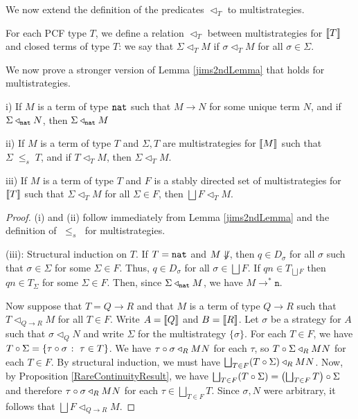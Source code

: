 \documentclass{entcs} \usepackage{prentcsmacro}
\newcommand{\stle}{{\;\le_s\;}}
\newcommand{\exlub}{\bigsqcup}
\newcommand{\opto}{\longrightarrow}
\newcommand{\n}{{\mathtt{n}}}
\newcommand{\0}{{\mathtt{0}}}
\newcommand{\plot}{\triangleleft}
\newcommand{\Tau}{T}
\begin{document}
We now extend the definition of the predicates $\plot_T$ to multistrategies.  

\begin{definition}
  For each PCF type $T$, we define a relation $\plot_T$ between multistrategies for $\left\llbracket T\right\rrbracket$ and closed terms of type $T$: we say that $\Sigma\plot_TM$ if $\sigma\plot_TM$ for all $\sigma\in\Sigma$.  
\end{definition}

We now prove a stronger version of Lemma \ref{jims2ndLemma} that holds for multistrategies.  

\begin{lemma}
  \label{multijims2ndLemma}
  i) If $M$ is a term of type ${\mathtt{nat}}$ such that $M\opto N$ for some unique term $N$, and if $\Sigma\plot_\nat N$, then $\Sigma\plot_\nat M$

  ii) If $M$ is a term of type $T$ and $\Sigma,\Tau$ are multistrategies for $\left\llbracket M\right\rrbracket$ such that $\Sigma\stle\Tau$, and if $\Tau\plot_TM$, then $\Sigma\plot_TM$.

  iii) If $M$ is a term of type $T$ and $F$ is a stably directed set of multistrategies for $\left\llbracket T\right\rrbracket$ such that $\Sigma\plot_TM$ for all $\Sigma\in F$, then $\exlub F\plot_TM$.
\end{lemma}
\begin{proof}
  (i) and (ii) follow immediately from Lemma \ref{jims2ndLemma} and the definition of $\stle$ for multistrategies.

  (iii): Structural induction on $T$.  If $T={\mathtt{nat}}$ and $M\not\Downarrow$, then $q\in D_\sigma$ for all $\sigma$ such that $\sigma\in\Sigma$ for some $\Sigma\in F$.  Thus, $q\in D_\sigma$ for all $\sigma\in\exlub F$.  If $qn\in T_{\exlub F}$ then $qn\in T_\Sigma$ for some $\Sigma\in F$.  Then, since $\Sigma\plot_\nat M$, we have $M\opto^*\n$.  

  Now suppose that $T=Q\to R$ and that $M$ is a term of type $Q\to R$ such that $\Tau\plot_{Q\to R}M$ for all $\Tau\in F$.  Write $A=\left\llbracket Q\right\rrbracket$ and $B=\left\llbracket R\right\rrbracket$.  Let $\sigma$ be a strategy for $A$ such that $\sigma\plot_QN$ and write $\Sigma$ for the multistrategy $\{\sigma\}$.  For each $\Tau\in F$, we have $\icomp\Tau\Sigma = \{\icomp\tau\sigma\suchthat\tau\in\Tau\}$.  We have $\icomp\tau\sigma\plot_RMN$ for each $\tau$, so $\icomp\Tau\Sigma\plot_RMN$ for each $\Tau\in F$.  By structural induction, we must have $\exlub_{\Tau\in F}(\icomp\Tau\Sigma)\plot_RMN$.  Now, by Proposition \ref{RareContinuityResult}, we have $\exlub_{\Tau\in F}(\icomp\Tau\Sigma)=\icomp{\left(\exlub_{\Tau\in F}\Tau\right)}\Sigma$ and therefore $\icomp\tau\sigma\plot_RMN$ for each $\tau\in\exlub_{\Tau\in F}\Tau$.  Since $\sigma, N$ were arbitrary, it follows that $\exlub F\plot_{Q\to R}M$.  
\end{proof}
\end{document}

